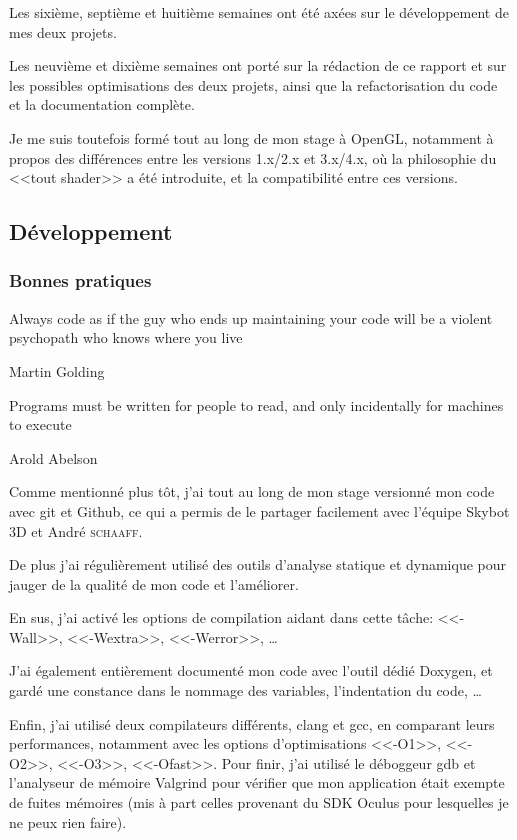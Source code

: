 \documentclass[a4paper,french,12pt]{article}
\begin{document}
		Les sixième, septième et huitième semaines ont été axées sur le développement de mes deux projets.
		
		Les neuvième et dixième semaines ont porté sur la rédaction de ce rapport et sur les possibles optimisations
		des deux projets, ainsi que la refactorisation du code et la documentation complète.
				
		Je me suis toutefois formé tout au long de mon stage à OpenGL, notamment à propos
		des différences entre les versions 1.x/2.x et 3.x/4.x, où la philosophie du <<tout shader>> a été introduite,
		et la compatibilité entre ces versions.
		
		
	
	\subsection{Développement}
	
	  \subsubsection{Bonnes pratiques}
	    \epigraph{Always code as if the guy who ends up maintaining your code will be a violent psychopath who knows where you live}{Martin Golding}
	    \epigraph{Programs must be written for people to read, and only incidentally for machines to execute}{Arold Abelson}
	    
	    Comme mentionné plus tôt, j'ai tout au long de mon stage versionné mon code avec git et Github, ce qui a
	    permis de le partager facilement avec l'équipe Skybot 3D et André \textsc{schaaff}.
	    
	    De plus j'ai régulièrement utilisé des outils d'analyse statique et dynamique pour jauger de la qualité de
	    mon code et l'améliorer.
	    
	    En sus, j'ai activé les options de compilation aidant dans cette tâche: <<-Wall>>, <<-Wextra>>, <<-Werror>>, \ldots
	    
	    
	    
	    J'ai également entièrement documenté mon code avec l'outil dédié Doxygen, et gardé une constance dans le nommage des variables,
	    l'indentation du code, \ldots
	    
	    Enfin, j'ai utilisé deux compilateurs différents, clang et gcc, en comparant leurs performances,
	    notamment avec les options d'optimisations <<-O1>>, <<-O2>>, <<-O3>>, <<-Ofast>>.
	    Pour finir, j'ai utilisé le déboggeur gdb et l'analyseur de mémoire Valgrind pour vérifier que mon application
	    était exempte de fuites mémoires (mis à part celles provenant du SDK Oculus pour lesquelles je ne peux rien faire).
	    
\end{document}
